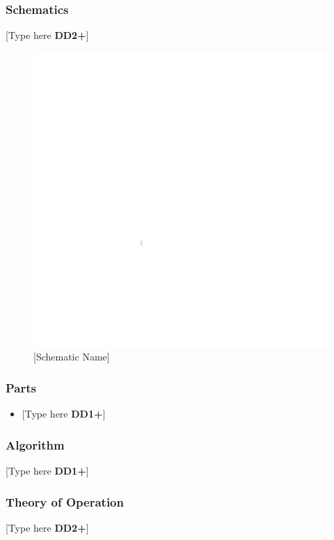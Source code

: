 \documentclass[letterpaper, 11pt]{article}
\begin{document}
\subsubsection{Schematics}
[Type here \textbf{DD2+}]
\begin{figure}[h]
    \centering
    \includegraphics[width=16cm]{white.png} %
    \caption{[Schematic Name]}
\end{figure} %

\subsubsection{Parts}
\begin{itemize}
    \item {[Type here \textbf{DD1+}]}
\end{itemize}

\subsubsection{Algorithm}
[Type here \textbf{DD1+}]

\subsubsection{Theory of Operation}
[Type here \textbf{DD2+}]
\end{document}
